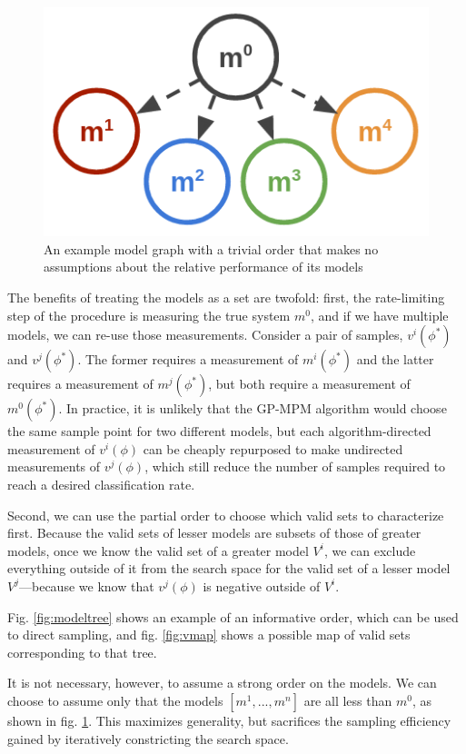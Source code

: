 \documentclass[letterpaper, 10 pt, conference]{ieeeconf}
\begin{document}
\begin{figure}[htbp]
    \centerline{\includegraphics[width=0.9\columnwidth]{img/model_tree_unordered.png}}
    \caption{An example model graph with a trivial order that makes no assumptions about the relative performance of its models
    }
    \label{fig:modeltree2}
\end{figure}

The benefits of treating the models as a set are twofold: first, the rate-limiting step of the procedure is measuring the true system $m^0$, and if we have multiple models, we can re-use those measurements. Consider a pair of samples, $v^i(\phi^*)$ and $v^j(\phi^*)$. The former requires a measurement of $m^i(\phi^*)$ and the latter requires a measurement of $m^j(\phi^*)$, but both require a measurement of $m^0(\phi^*)$. In practice, it is unlikely that the GP-MPM algorithm would choose the same sample point for two different models, but each algorithm-directed measurement of $v^i(\phi)$ can be cheaply repurposed to make undirected measurements of $v^j(\phi)$, which still reduce the number of samples required to reach a desired classification rate.

Second, we can use the partial order to choose which valid sets to characterize first. Because the valid sets of lesser models are subsets of those of greater models, once we know the valid set of a greater model $V^i$, we can exclude everything outside of it from the search space for the valid set of a lesser model $V^j$---because we know that $v^j(\phi)$ is negative outside of $V^i$.

Fig. \ref{fig:modeltree} shows an example of an informative order, which can be used to direct sampling, and fig. \ref{fig:vmap} shows a possible map of valid sets corresponding to that tree.

It is not necessary, however, to assume a strong order on the models. We can choose to assume only that the models $[m^1,...,m^n]$ are all less than $m^0$, as shown in fig. \ref{fig:modeltree2}. This maximizes generality, but sacrifices the sampling efficiency gained by iteratively constricting the search space.
\end{document}
